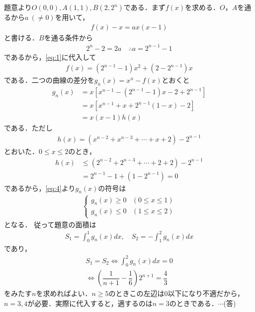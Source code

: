 \documentclass[../../main.tex]{subfiles}
\begin{document}
題意より$O(0,0), A(1,1), B(2,2^n)$である．まず$f(x)$を求める．$O$，$A$を通るから$a \ (\neq 0)$を用いて，
\begin{align}
  f(x)-x=ax(x-1) \label{eq:1}
\end{align}
と書ける．$B$を通る条件から
\begin{align}
  2^n-2=2a \quad\therefore a=2^{n-1}-1 \label{eq:2}
\end{align}
であるから，\cref{eq:1}に代入して
\begin{align}
  f(x)=(2^{n-1}-1)x^2+(2-2^{n-1})x \label{eq:3}
\end{align}
である．二つの曲線の差分を$g_n(x)=x^n-f(x)$とおくと
\begin{align}
  g_n(x)
  &=x\left[x^{n-1}-(2^{n-1}-1)x-2+2^{n-1}\right] \nonumber\\
  &=x\left[x^{n-1}+x+2^{n-1}(1-x)-2\right] \nonumber\\
  &=x(x-1)h(x) \label{eq:4}
\end{align}
である．ただし
\begin{align}
  h(x)=(x^{n-2}+x^{n-3}+\cdots+x+2)-2^{n-1}
\end{align}
とおいた．$0\le x\le2$のとき，
\begin{align}
  h(x)
  &\le (2^{n-2}+2^{n-3}+\cdots+2+2)-2^{n-1} \\
  &=2^{n-1}-1+(1-2^{n-1})=0
\end{align}
であるから，\cref{eq:4}より$g_n(x)$の符号は
\begin{align}
  \begin{cases}
    g_n(x)\ge0&(0\le x\le1) \\
    g_n(x)\le0&(1\le x\le2)
  \end{cases}
\end{align}
となる．
従って題意の面積は
\begin{align}
  S_1=\int_0^1g_n(x)dx, \quad
  S_2=-\int_1^2g_n(x)dx
\end{align}
であり，
\begin{align}
  S_1=S_2\Longleftrightarrow \int_0^2g_n(x)dx=0 \\
  \Longleftrightarrow
  \left(\dfrac{1}{n+1}-\dfrac{1}{6}\right)2^{n+1}=\dfrac{4}{3}
\end{align}
をみたす$n$を求めればよい．$n\ge5$のときこの左辺は$0$以下になり不適だから，$n=3,4$が必要．実際に代入すると，適するのは$n=3$のときである．$\cdots$(答)
\newpage
\end{document}
